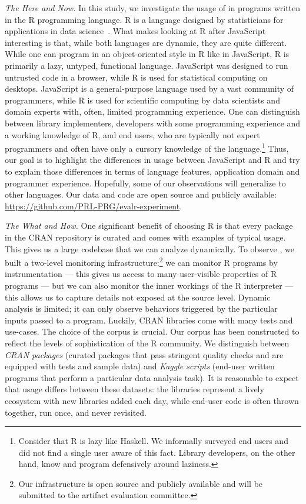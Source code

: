 \documentclass[screen,acmsmall]{acmart}
\begin{document}
\vspace{2mm}\noindent\emph{The Here and Now.} In this study, we investigate the
usage of \eval in programs written in the R programming language. R is a language
designed by statisticians for applications in data science~\cite{r,R96}. What
makes looking at R after JavaScript interesting is that, while both languages
are dynamic, they are quite different. While one can program in an
object-oriented style in R like in JavaScript, R is primarily a lazy, untyped,
functional language. JavaScript was designed to run untrusted code in a browser,
while R is used for statistical computing on desktops. JavaScript is a general-purpose language used by a vast community of programmers, while R is used for
scientific computing by data scientists and domain experts with, often, limited
programming experience. One can distinguish between library implementers,
developers with some programming experience and a working knowledge of R, and
end users, who are typically not expert programmers and often have only a
cursory knowledge of the language.\footnote{Consider that R is lazy like
Haskell. We informally surveyed end users and did not find a single user aware
of this fact. Library developers, on the other hand, know and program
defensively around laziness.} Thus, our goal is to highlight the differences in
usage between JavaScript and R and try to explain those differences in terms of
language features, application domain and programmer experience. Hopefully, some
of our observations will generalize to other languages.
Our data and code are open source and publicly
available: \url{https://github.com/PRL-PRG/evalr-experiment}.

\vspace{2mm}\noindent\emph{The What and How.} One significant benefit of
choosing R is that every package in the CRAN repository is curated and comes
with examples of typical usage. This gives us a large codebase that we can
analyze dynamically. To observe \eval, we built a two-level monitoring
infrastructure:\footnote{Our infrastructure is open source and publicly
available and  will be submitted to the artifact evaluation committee. } we can
monitor R programs by instrumentation --- this gives us access to many
user-visible properties of R programs --- but we can also monitor the
inner workings of the R interpreter --- this allows us to capture details not
exposed at the source level. Dynamic analysis is limited; it can only observe
behaviors triggered by the particular inputs passed to a program. Luckily, CRAN
libraries come with many tests and use-cases. The choice of the corpus is crucial.
Our corpus has been constructed to reflect the levels of sophistication of the R
community. We distinguish between \emph{CRAN packages} (\CranPackages curated
packages that pass stringent quality checks and are equipped with tests and
sample data) and \emph{Kaggle scripts} (\KaggleUnique end-user written programs
that perform a particular data analysis task). It is reasonable to expect that
\eval usage differs between these datasets: the libraries represent a lively
ecosystem with new libraries added each day, while end-user code is often thrown
together, run once, and never revisited.
\end{document}
